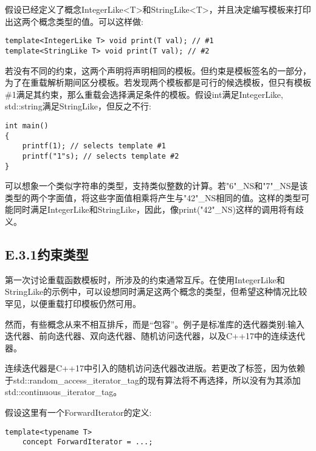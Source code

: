 
假设已经定义了概念IntegerLike<T>和StringLike<T>，并且决定编写模板来打印出这两个概念类型的值。可以这样做:

\begin{lstlisting}[style=styleCXX]
template<IntegerLike T> void print(T val); // #1
template<StringLike T> void print(T val); // #2
\end{lstlisting}

若没有不同的约束，这两个声明将声明相同的模板。但约束是模板签名的一部分，为了在重载解析期间区分模板。若发现两个模板都是可行的候选模板，但只有模板\#1满足其约束，那么重载会选择满足条件的模板。假设int满足IntegerLike, std::string满足StringLike，但反之不行:

\begin{lstlisting}[style=styleCXX]
int main()
{
	printf(1); // selects template #1
	printf("1"s); // selects template #2
}
\end{lstlisting}

可以想象一个类似字符串的类型，支持类似整数的计算。若"6"\_NS和"7"\_NS是该类型的两个字面值，将这些字面值相乘将产生与"42"\_NS相同的值。这样的类型可能同时满足IntegerLike和StringLike，因此，像print("42"\_NS)这样的调用将有歧义。

\subsection{E.3.1\hspace{0.2cm}约束类型}

第一次讨论重载函数模板时，所涉及的约束通常互斥。在使用IntegerLike和StringLike的示例中，可以设想同时满足这两个概念的类型，但希望这种情况比较罕见，以便重载打印模板仍然可用。

然而，有些概念从来不相互排斥，而是“包容”。例子是标准库的迭代器类别:输入迭代器、前向迭代器、双向迭代器、随机访问迭代器，以及C++17中的连续迭代器。

\begin{tcolorbox}[colback=webgreen!5!white,colframe=webgreen!75!black]
\hspace*{0.75cm}连续迭代器是C++17中引入的随机访问迭代器改进版。若更改了标签，因为依赖于std::random\_access\_iterator\_tag的现有算法将不再选择，所以没有为其添加std::continuous\_iterator\_tag。
\end{tcolorbox}

假设这里有一个ForwardIterator的定义:

\begin{lstlisting}[style=styleCXX]
template<typename T>
	concept ForwardIterator = ...;
\end{lstlisting}


